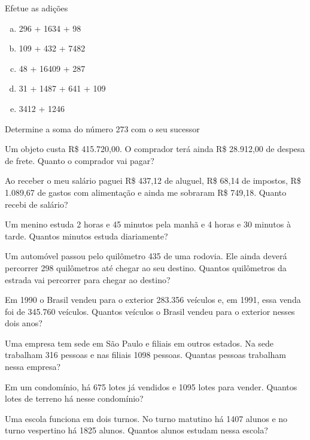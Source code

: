 \item Efetue as adições

\begin{multicols}{2}
\begin{enumerate}[a)]
	\item 296 + 1634 + 98
	\item 109 + 432 + 7482
	\item 48 + 16409 + 287
	\item 31 + 1487 + 641 + 109
	\item 3412 + 1246
\end{enumerate}
\end{multicols}

\item Determine a soma do número 273 com o seu sucessor

\item Um objeto custa R\$ 415.720,00. O comprador terá ainda R\$ 28.912,00 de despesa de frete. Quanto o comprador vai pagar?

\item Ao receber o meu salário paguei R\$ 437,12 de aluguel, R\$ 68,14 de impostos, R\$ 1.089,67 de gastos com alimentação e ainda me sobraram R\$ 749,18. Quanto recebi de salário?

\item Um menino estuda 2 horas e 45 minutos pela manhã e 4 horas e 30 minutos à tarde. Quantos minutos estuda diariamente?

\item Um automóvel passou pelo quilômetro 435 de uma rodovia. Ele ainda deverá percorrer 298 quilômetros até chegar ao seu destino. Quantos quilômetros da estrada vai percorrer para chegar ao destino?

\item Em 1990 o Brasil vendeu para o exterior 283.356 veículos e, em 1991, essa venda foi de 345.760 veículos. Quantos veículos o Brasil vendeu para o exterior nesses dois anos?

\item Uma empresa tem sede em São Paulo e filiais em outros estados. Na sede trabalham 316 pessoas e nas filiais 1098 pessoas. Quantas pessoas trabalham nessa empresa?

\item Em um condomínio, há 675 lotes já vendidos e 1095 lotes para vender. Quantos lotes de terreno há nesse condomínio?

\item Uma escola funciona em dois turnos. No turno matutino há 1407 alunos e no turno vespertino há 1825 alunos. Quantos alunos estudam nessa escola?

